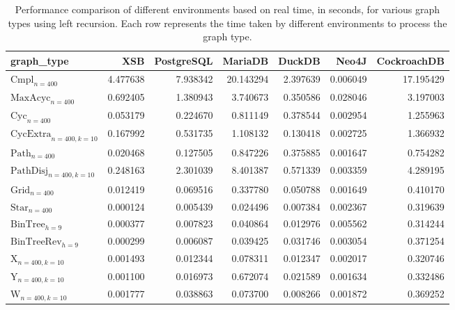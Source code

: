 \begin{table}
\caption{Performance comparison of different environments based on real time, in seconds, for various graph types using left recursion. Each row represents the time taken by different environments to process the graph type.}
\label{table:results}
\begin{tabular}{lrrrrrr}
\toprule
graph_type & XSB & PostgreSQL & MariaDB & DuckDB & Neo4J & CockroachDB \\
\midrule
$\text{Cmpl}_{n=400}$ & 4.477638 & 7.938342 & 20.143294 & 2.397639 & 0.006049 & 17.195429 \\
$\text{MaxAcyc}_{n=400}$ & 0.692405 & 1.380943 & 3.740673 & 0.350586 & 0.028046 & 3.197003 \\
$\text{Cyc}_{n=400}$ & 0.053179 & 0.224670 & 0.811149 & 0.378544 & 0.002954 & 1.255963 \\
$\text{CycExtra}_{n=400,k=10}$ & 0.167992 & 0.531735 & 1.108132 & 0.130418 & 0.002725 & 1.366932 \\
$\text{Path}_{n=400}$ & 0.020468 & 0.127505 & 0.847226 & 0.375885 & 0.001647 & 0.754282 \\
$\text{PathDisj}_{n=400,k=10}$ & 0.248163 & 2.301039 & 8.401387 & 0.571339 & 0.003359 & 4.289195 \\
$\text{Grid}_{n=400}$ & 0.012419 & 0.069516 & 0.337780 & 0.050788 & 0.001649 & 0.410170 \\
$\text{Star}_{n=400}$ & 0.000124 & 0.005439 & 0.024496 & 0.007384 & 0.002367 & 0.319639 \\
$\text{BinTree}_{h=9}$ & 0.000377 & 0.007823 & 0.040864 & 0.012976 & 0.005562 & 0.314244 \\
$\text{BinTreeRev}_{h=9}$ & 0.000299 & 0.006087 & 0.039425 & 0.031746 & 0.003054 & 0.371254 \\
$\text{X}_{n=400, k=10}$ & 0.001493 & 0.012344 & 0.078311 & 0.012347 & 0.002017 & 0.320746 \\
$\text{Y}_{n=400,k=10}$ & 0.001100 & 0.016973 & 0.672074 & 0.021589 & 0.001634 & 0.332486 \\
$\text{W}_{n=400,k=10}$ & 0.001777 & 0.038863 & 0.073700 & 0.008266 & 0.001872 & 0.369252 \\
\bottomrule
\end{tabular}
\end{table}
